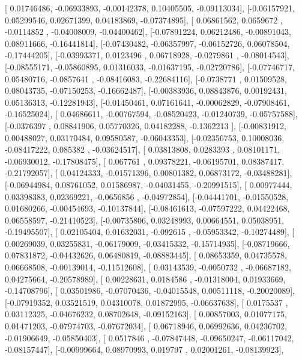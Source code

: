 \documentclass{article}
\begin{document}
       [ 0.01746486, -0.06933893, -0.00142378,  0.10405505, -0.09113034],
       [-0.06157921,  0.05299546,  0.02671399,  0.04183869, -0.07374895],
       [ 0.06861562,  0.0659672 , -0.0114852 , -0.04008009, -0.04400462],
       [-0.07891224,  0.06212486, -0.00891043,  0.08911666, -0.16441814],
       [-0.07430482, -0.06357997, -0.06152726,  0.06078504, -0.17444205],
       [-0.03993371,  0.0123496 ,  0.06718928, -0.0279861 , -0.08014543],
       [-0.08555171, -0.05860895,  0.01316033, -0.01637195, -0.02720786],
       [-0.07746717,  0.05480716, -0.0857641 , -0.08416083, -0.22684116],
       [-0.0738771 ,  0.01509528,  0.08043735, -0.07150253, -0.16662487],
       [-0.00383936,  0.08843876,  0.00192431,  0.05136313, -0.12281943],
       [-0.01450461,  0.07161641, -0.00062829, -0.07908461, -0.16525024],
       [ 0.04686611, -0.00767594, -0.08520423, -0.01240739, -0.05757588],
       [-0.0376397 ,  0.08841906,  0.05770326,  0.04182288, -0.1362213 ],
       [-0.00831912,  0.00488027,  0.03170484,  0.09580587, -0.06043353],
       [-0.02356753,  0.10008036, -0.08417222,  0.085382  , -0.03624517],
       [ 0.03813808,  0.0283393 ,  0.08101171, -0.06930012, -0.17808475],
       [ 0.067761  ,  0.09378221, -0.06195701,  0.08387417, -0.21792057],
       [ 0.04124333, -0.01571396,  0.00801382,  0.06873172, -0.03488281],
       [-0.06944984,  0.08761052,  0.01586987, -0.04031455, -0.20991515],
       [ 0.00977444,  0.03398383,  0.02369221, -0.0656856 , -0.04972854],
       [-0.04441701, -0.01550528,  0.01680266, -0.00454693, -0.10137844],
       [-0.08461613, -0.07597222,  0.04422468,  0.06558597, -0.21410523],
       [-0.00735806,  0.03248993,  0.00664551,  0.05038951, -0.19495507],
       [ 0.02105404,  0.01632031, -0.092615  , -0.05953342, -0.10274489],
       [ 0.00269039,  0.03255831, -0.06179009, -0.03415332, -0.15714935],
       [-0.08719666,  0.07831872, -0.04432626,  0.06480819, -0.08883445],
       [ 0.08653359,  0.04735578,  0.06668508, -0.00139014, -0.11512608],
       [ 0.03143539, -0.0050732 , -0.06687182,  0.04275664, -0.20578989],
       [ 0.00228631,  0.0184586 , -0.01318004,  0.01933669, -0.14708796],
       [ 0.03501986, -0.07070436, -0.04015548,  0.00511118, -0.20020089],
       [-0.07919352,  0.03521519,  0.04310078,  0.01872995, -0.06637638],
       [ 0.0175537 ,  0.03112325, -0.04676232,  0.08702648, -0.09152163],
       [ 0.00857003,  0.01077175,  0.01471203, -0.07974703, -0.07672034],
       [ 0.06718946,  0.06992636,  0.04236702, -0.01906649, -0.05850403],
       [ 0.0517846 , -0.07847448, -0.09650247, -0.06117042, -0.08157447],
       [-0.00999664,  0.08970993,  0.019797  ,  0.02001261, -0.08139923],
\end{document}
